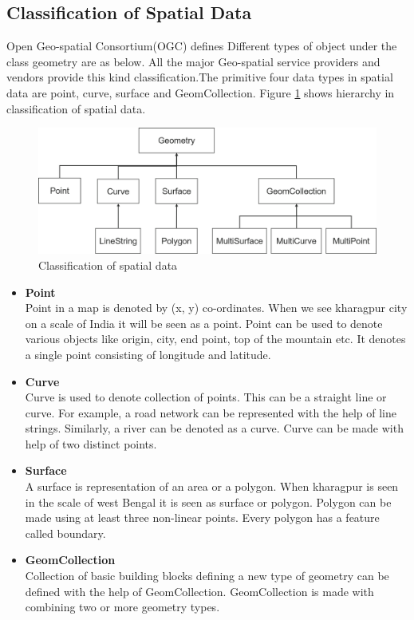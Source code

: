 \subsection{Classification of Spatial Data}
Open Geo-spatial Consortium(OGC) defines  Different types of object under the class geometry are as below. All the major Geo-spatial service providers and vendors provide this kind classification.The primitive four data types in spatial data are point, curve, surface and GeomCollection. Figure \ref{cosd} shows hierarchy in classification of spatial data.\\
\newline
\begin{figure}[h]
    \centering
    \includegraphics[width=\textwidth]{pix/p}
    \caption{Classification of spatial data}
    \label{cosd}
\end{figure}
\newline
\begin{itemize}
\item \textbf{Point}\\
Point in a map is denoted by (x, y) co-ordinates. When we see kharagpur city on a scale
of India it will be seen as a point. Point can be used to denote various objects like origin,
city, end point, top of the mountain etc. It denotes a single point consisting of longitude and latitude.\\

\item \textbf{Curve}\\
Curve is used to denote collection of points. This can be a straight line or curve. For
example, a road network can be represented with the help of line strings. Similarly, a
river can be denoted as a curve. Curve can be made with help of two distinct points.\\

\item \textbf{Surface}\\
A surface is representation of an area or a polygon. When kharagpur is seen in the scale
of west Bengal it is seen as surface or polygon. Polygon can be made using at least three non-linear points. Every polygon has a feature called boundary.\\

\item \textbf{GeomCollection}\\
Collection of basic building blocks defining a new type of geometry can be defined
with the help of GeomCollection. GeomCollection is made with combining two or more geometry types.\\

\end{itemize}


